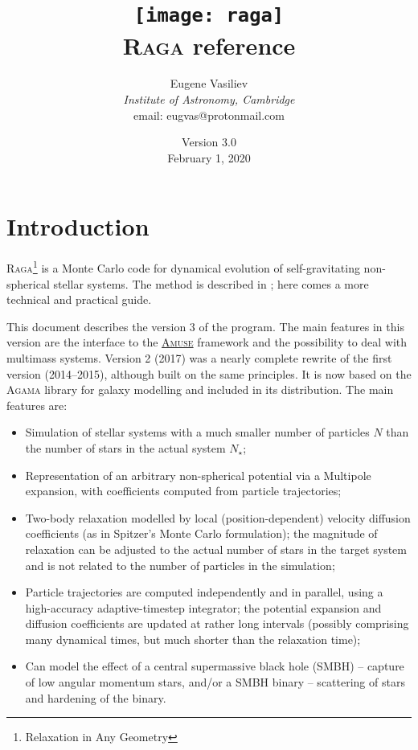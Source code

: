 \documentclass[12pt]{article}
\newcommand{\Raga}{\textsc{Raga}\xspace}
\newcommand{\Agama}{\textsc{Agama}\xspace}
\newcommand{\Amuse}{\textsc{Amuse}\xspace}
\begin{document}
\title{
\texttt{[image: raga]} \protect\\[1cm]
\protect\Raga reference}
\author{Eugene Vasiliev\\
\normalsize\textit{Institute of Astronomy, Cambridge}\\
\normalsize\textrm{email: eugvas@protonmail.com} }

\date{Version 3.0\\ February 1, 2020}

\maketitle
\tableofcontents

\section{Introduction}
\Raga\footnote{Relaxation in Any Geometry}
is a Monte Carlo code for dynamical evolution of self-gravitating non-spherical stellar systems.
The method is described in \cite{Vasiliev2015}; here comes a more technical and practical guide.

This document describes the version 3 of the program. The main features in this version are the interface to the \href{http://amusecode.org}{\Amuse} framework \cite{AMUSE} and the possibility to deal with multimass systems.
Version 2 (2017) was a nearly complete rewrite of the first version (2014--2015), although built on the same principles. It is now based on the \Agama library for galaxy modelling \cite{Vasiliev2019} and included in its distribution. The main features are:
\begin{itemize}
\item Simulation of stellar systems with a much smaller number of particles $N$ than the number of stars in the actual system $N_\star$;
\item Representation of an arbitrary non-spherical potential via a Multipole expansion, with coefficients computed from particle trajectories;
\item Two-body relaxation modelled by local (position-dependent) velocity diffusion coefficients (as in Spitzer's Monte Carlo formulation); the magnitude of relaxation can be adjusted to the actual number of stars in the target system and is not related to the number of particles in the simulation;
\item Particle trajectories are computed independently and in parallel, using a high-accuracy adaptive-timestep integrator; the potential expansion and diffusion coefficients are updated at rather long intervals (possibly comprising many dynamical times, but much shorter than the relaxation time);
\item Can model the effect of a central supermassive black hole (SMBH) -- capture of low angular momentum stars, and/or a SMBH binary -- scattering of stars and hardening of the binary.
\end{itemize}
\end{document}
